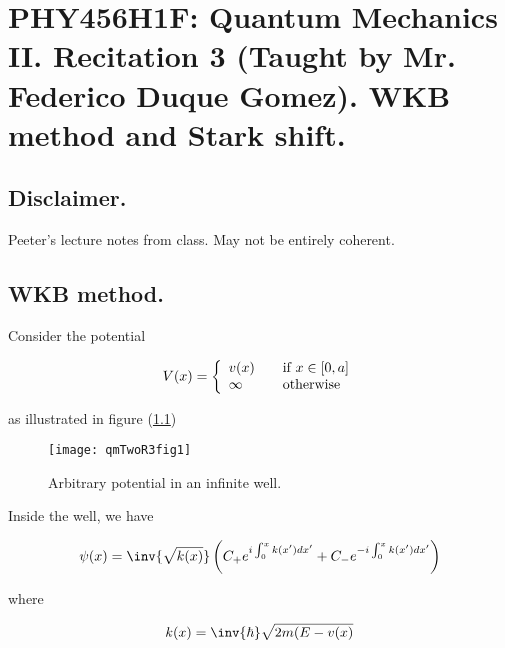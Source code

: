 
%

\chapter{PHY456H1F: Quantum Mechanics II.  Recitation 3 (Taught by Mr. Federico Duque Gomez).  WKB method and Stark shift.}
\label{chap:qmTwoR3}
{}
\date{Oct 28, 2011}

\beginArtWithToc

\section{Disclaimer.}

Peeter's lecture notes from class.  May not be entirely coherent.

\section{WKB method.}

Consider the potential

\begin{equation}\label{eqn:qmTwoR3:10}
V(x) = 
\left\{
\begin{array}{l l}
v(x) & \quad \mbox{if $x \in [0,a]$} \\
\infty & \quad \mbox{otherwise} \\
\end{array}
\right.
\end{equation}

as illustrated in figure (\ref{fig:qmTwoR3:qmTwoR3fig1})
\begin{figure}[htp]
   \centering
   \texttt{[image: qmTwoR3fig1]}
   \caption{Arbitrary potential in an infinite well.}\label{fig:qmTwoR3:qmTwoR3fig1}
\end{figure}

Inside the well, we have

\begin{equation}\label{eqn:qmTwoR3:30}
\psi(x) = \inv{\sqrt{k(x)}} \left( 
C_{+} e^{i \int_0^x k(x') dx'}
+C_{-} e^{-i \int_0^x k(x') dx'}
\right)
\end{equation}

where

\begin{equation}\label{eqn:qmTwoR3:50}
k(x) = \inv{\hbar} \sqrt{ 2m( E - v(x) }
\end{equation}

